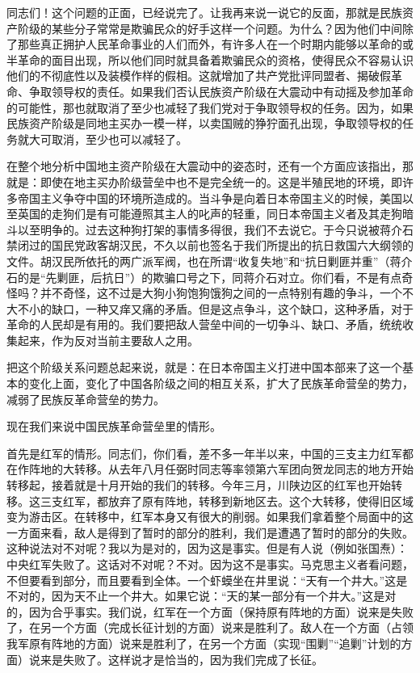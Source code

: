 同志们！这个问题的正面，已经说完了。让我再来说一说它的反面，那就是民族资产阶级的某些分子常常是欺骗民众的好手这样一个问题。为什么？因为他们中间除了那些真正拥护人民革命事业的人们而外，有许多人在一个时期内能够以革命的或半革命的面目出现，所以他们同时就具备着欺骗民众的资格，使得民众不容易认识他们的不彻底性以及装模作样的假相。这就增加了共产党批评同盟者、揭破假革命、争取领导权的责任。如果我们否认民族资产阶级在大震动中有动摇及参加革命的可能性，那也就取消了至少也减轻了我们党对于争取领导权的任务。因为，如果民族资产阶级是同地主买办一模一样，以卖国贼的狰狞面孔出现，争取领导权的任务就大可取消，至少也可以减轻了。

在整个地分析中国地主资产阶级在大震动中的姿态时，还有一个方面应该指出，那就是：即使在地主买办阶级营垒中也不是完全统一的。这是半殖民地的环境，即许多帝国主义争夺中国的环境所造成的。当斗争是向着日本帝国主义的时候，美国以至英国的走狗们是有可能遵照其主人的叱声的轻重，同日本帝国主义者及其走狗暗斗以至明争的。过去这种狗打架的事情多得很，我们不去说它。于今只说被蒋介石禁闭过的国民党政客胡汉民，不久以前也签名于我们所提出的抗日救国六大纲领的文件。胡汉民所依托的两广派军阀，也在所谓“收复失地”和“抗日剿匪并重”（蒋介石的是“先剿匪，后抗日”）的欺骗口号之下，同蒋介石对立。你们看，不是有点奇怪吗？并不奇怪，这不过是大狗小狗饱狗饿狗之间的一点特别有趣的争斗，一个不大不小的缺口，一种又痒又痛的矛盾。但是这点争斗，这个缺口，这种矛盾，对于革命的人民却是有用的。我们要把敌人营垒中间的一切争斗、缺口、矛盾，统统收集起来，作为反对当前主要敌人之用。

把这个阶级关系问题总起来说，就是：在日本帝国主义打进中国本部来了这一个基本的变化上面，变化了中国各阶级之间的相互关系，扩大了民族革命营垒的势力，减弱了民族反革命营垒的势力。

现在我们来说中国民族革命营垒里的情形。

首先是红军的情形。同志们，你们看，差不多一年半以来，中国的三支主力红军都在作阵地的大转移。从去年八月任弼时同志等率领第六军团向贺龙同志的地方开始转移起，接着就是十月开始的我们的转移。今年三月，川陕边区的红军也开始转移。这三支红军，都放弃了原有阵地，转移到新地区去。这个大转移，使得旧区域变为游击区。在转移中，红军本身又有很大的削弱。如果我们拿着整个局面中的这一方面来看，敌人是得到了暂时的部分的胜利，我们是遭遇了暂时的部分的失败。这种说法对不对呢？我以为是对的，因为这是事实。但是有人说（例如张国焘）：中央红军失败了。这话对不对呢？不对。因为这不是事实。马克思主义者看问题，不但要看到部分，而且要看到全体。一个虾蟆坐在井里说：“天有一个井大。”这是不对的，因为天不止一个井大。如果它说：“天的某一部分有一个井大。”这是对的，因为合乎事实。我们说，红军在一个方面（保持原有阵地的方面）说来是失败了，在另一个方面（完成长征计划的方面）说来是胜利了。敌人在一个方面（占领我军原有阵地的方面）说来是胜利了，在另一个方面（实现“围剿”“追剿”计划的方面）说来是失败了。这样说才是恰当的，因为我们完成了长征。

